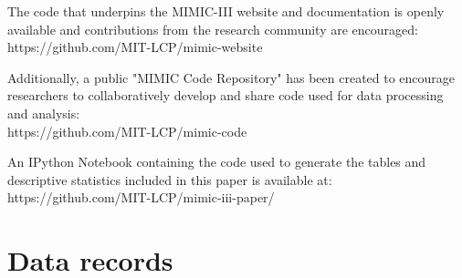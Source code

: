 \documentclass[english]{article}
\begin{document}



The code that underpins the MIMIC-III website and documentation is openly available and contributions from the research community are encouraged: \\ https://github.com/MIT-LCP/mimic-website 

Additionally, a public "MIMIC Code Repository" has been created to encourage researchers to collaboratively develop and share code used for data processing and analysis: \\ https://github.com/MIT-LCP/mimic-code

An IPython Notebook containing the code used to generate the tables and descriptive statistics included in this paper is available at: \\ https://github.com/MIT-LCP/mimic-iii-paper/


\section*{Data records}


\end{document}
